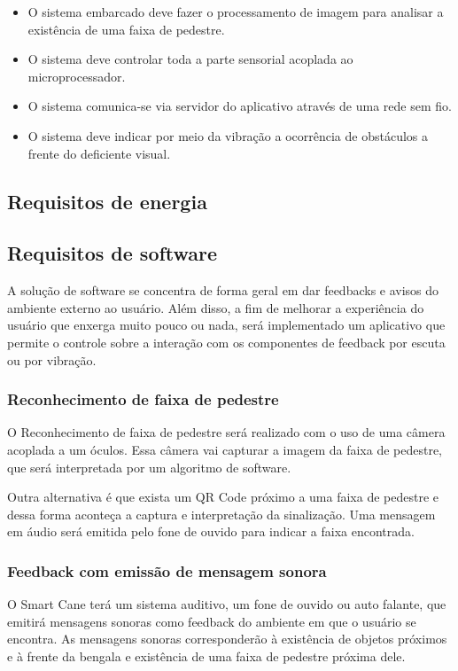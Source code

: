 \begin{itemize}
\item O sistema embarcado deve fazer o processamento de imagem para analisar a existência de uma faixa de pedestre.
\item O sistema deve controlar toda a parte sensorial acoplada ao microprocessador.
\item O sistema comunica-se via servidor do aplicativo através de uma rede sem fio.
\item O sistema deve indicar por meio da vibração a ocorrência de obstáculos a frente do deficiente visual.
\end{itemize}

\subsection{Requisitos de energia}

\subsection{Requisitos de software}

A solução de software se concentra de forma geral em dar feedbacks e avisos do ambiente externo ao usuário. Além disso, a fim de melhorar a experiência do usuário que enxerga muito pouco ou nada, será implementado um aplicativo que permite o controle sobre a interação com os componentes de feedback por escuta ou por vibração.

\subsubsection{Reconhecimento de faixa de pedestre}

O Reconhecimento de faixa de pedestre será realizado com o uso de uma câmera acoplada a um óculos. Essa câmera vai capturar a imagem da faixa de pedestre, que será interpretada por um algoritmo de software.

Outra alternativa é que exista um QR Code próximo a uma faixa de pedestre e dessa forma aconteça a captura e interpretação da sinalização. Uma mensagem em áudio será emitida pelo fone de ouvido para indicar a faixa encontrada.

\subsubsection{Feedback com emissão de mensagem sonora}

O Smart Cane terá um sistema auditivo, um fone de ouvido ou auto falante, que emitirá mensagens sonoras como feedback do ambiente em que o usuário se encontra. As mensagens sonoras corresponderão à existência de objetos próximos e à frente da bengala e existência de uma faixa de pedestre próxima dele.

